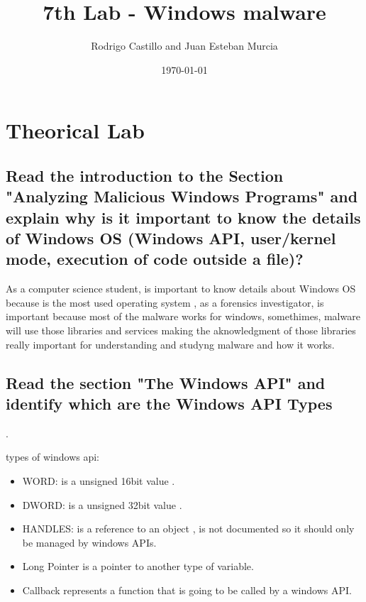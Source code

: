 \documentclass[10pt,a4paper]{article} %
\begin{document}
    \title{{  7th Lab - Windows malware  }}
    \author{{Rodrigo Castillo and Juan Esteban Murcia}}
    \date{\today}

    \maketitle


    \section{Theorical Lab}

        \subsection{Read the introduction to the Section "Analyzing Malicious Windows
            Programs" and explain why is it important to know the details of Windows OS
            (Windows API, user/kernel mode, execution of code outside a file)?}

            As a computer science student, is important to know details about
            Windows OS because is the most used operating system , as a forensics
            investigator, is important because most of the malware works for
            windows, somethimes, malware will use those libraries and services
            making the aknowledgment of those libraries really important for
            understanding and studyng malware and how it works.

        \subsection{Read the section "The Windows API" and identify which are the
            Windows API Types}.

            types of windows api:
            \begin{itemize}
                \item {WORD:}
                    is a unsigned 16bit value .
                \item {DWORD:}
                    is a unsigned 32bit value .
                \item {HANDLES:}
                    is a reference to an object , is not documented so it should
                    only be managed by windows APIs.
                \item {Long Pointer}
                    is a pointer to another type of variable.
                \item {Callback}
                    represents a function that is going to be called by a windows
                    API.
            \end{itemize}
\end{document}
